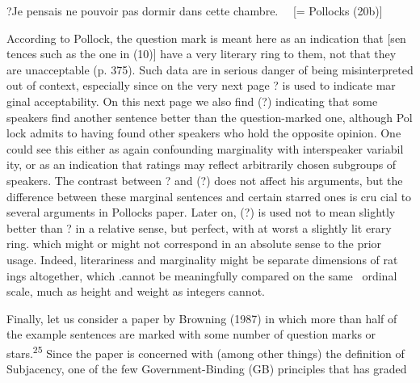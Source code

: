 \setcounter{listWWNumlixleveli}{7}
\begin{listWWNumlixleveli}
\item 
\begin{styleStandard}
?Je pensais ne pouvoir pas dormir dans cette chambre. \ \ [= Pollock{\textquotesingle}s (20b)]
\end{styleStandard}


\end{listWWNumlixleveli}
\begin{styleStandard}
According to Pollock, {\textquotedbl}the question mark is meant here as an indication that [sen\- tences such as the one in (10)] have a very literary ring to them, not that they are unacceptable{\textquotedbl} (p. 375). Such data are in serious danger of being misinterpreted out of context, especially since on the very next page {\textquotedbl}?{\textquotedbl} is used to indicate mar\- ginal acceptability. On this next page we also find {\textquotedbl}(?){\textquotedbl} indicating that some speakers find another sentence better than the question-marked one, although Pol\- lock admits to having found other speakers who hold the opposite opinion. One could see this either as again confounding marginality with interspeaker variabil\- ity, or as an indication that ratings may reflect arbitrarily chosen subgroups of speakers. The contrast between {\textquotedbl}?{\textquotedbl} and {\textquotedbl}(?){\textquotedbl} does not affect his arguments, but the difference between these marginal sentences and certain starred ones is cru\- cial to several arguments in Pollock{\textquotesingle}s paper. Later on, {\textquotedbl}(?){\textquotedbl} is used not to mean {\textquotedbl}slightly better than ?{\textquotedbl} in a relative sense, but {\textquotedbl}perfect, with at worst a slightly lit\- erary ring.{\textquotedbl} which might or might not correspond in an absolute sense to the prior usage. Indeed, literariness and marginality might be separate dimensions of rat\- ings altogether, which .cannot be meaningfully compared on the same \ ordinal scale, much as height and weight as integers cannot.
\end{styleStandard}


\begin{styleStandard}
Finally, let us consider a paper by Browning (1987) in which more than half of the example sentences are marked with some number of question marks or stars.\textsuperscript{25}\textsuperscript{ }Since the paper is concerned with (among other things) the definition of Subjacency, one of the few Government-Binding (GB) principles that has graded
\end{styleStandard}


